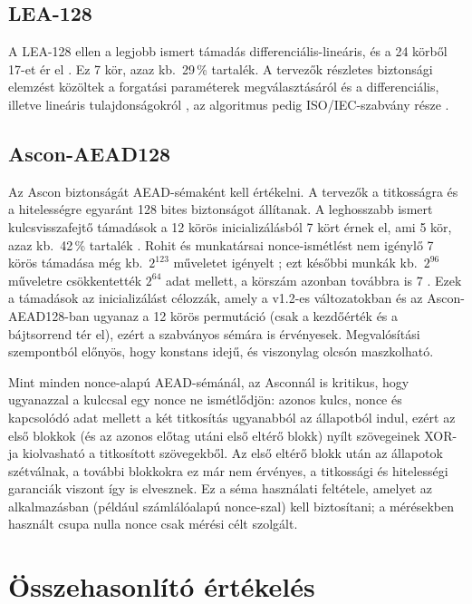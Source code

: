 \documentclass[a4paper,12pt]{report}
\theoremstyle{definition}
\theoremstyle{remark}
\begin{document}
\subsection{LEA-128}

A LEA-128 ellen a legjobb ismert támadás differenciális-lineáris, és a 24 körből 17-et ér el \cite{Chen2023}. Ez 7 kör, azaz kb.\ 29\,\% tartalék. A tervezők részletes biztonsági elemzést közöltek a forgatási paraméterek megválasztásáról és a differenciális, illetve lineáris tulajdonságokról \cite{Hong2013}, az algoritmus pedig ISO/IEC-szabvány része \cite{ISO29192}.

\subsection{Ascon-AEAD128}

Az Ascon biztonságát AEAD-sémaként kell értékelni. A tervezők a titkosságra és a hitelességre egyaránt 128 bites biztonságot állítanak. A leghosszabb ismert kulcsvisszafejtő támadások a 12 körös inicializálásból 7 kört érnek el, ami 5 kör, azaz kb.\ 42\,\% tartalék \cite{Dobraunig2021,Rohit2021}. Rohit és munkatársai nonce-ismétlést nem igénylő 7 körös támadása még kb.\ $2^{123}$ műveletet igényelt \cite{Rohit2021}; ezt későbbi munkák kb.\ $2^{96}$ műveletre csökkentették $2^{64}$ adat mellett, a körszám azonban továbbra is 7 \cite{Peng2025}. Ezek a támadások az inicializálást célozzák, amely a v1.2-es változatokban és az Ascon-AEAD128-ban ugyanaz a 12 körös permutáció (csak a kezdőérték és a bájtsorrend tér el), ezért a szabványos sémára is érvényesek. Megvalósítási szempontból előnyös, hogy konstans idejű, és viszonylag olcsón maszkolható.

Mint minden nonce-alapú AEAD-sémánál, az Asconnál is kritikus, hogy ugyanazzal a kulccsal egy nonce ne ismétlődjön: azonos kulcs, nonce és kapcsolódó adat mellett a két titkosítás ugyanabból az állapotból indul, ezért az első blokkok (és az azonos előtag utáni első eltérő blokk) nyílt szövegeinek XOR-ja kiolvasható a titkosított szövegekből. Az első eltérő blokk után az állapotok szétválnak, a további blokkokra ez már nem érvényes, a titkossági és hitelességi garanciák viszont így is elvesznek. Ez a séma használati feltétele, amelyet az alkalmazásban (például számlálóalapú nonce-szal) kell biztosítani; a mérésekben használt csupa nulla nonce csak mérési célt szolgált.

\section{Összehasonlító értékelés}\label{sec:security_compare}
\end{document}

